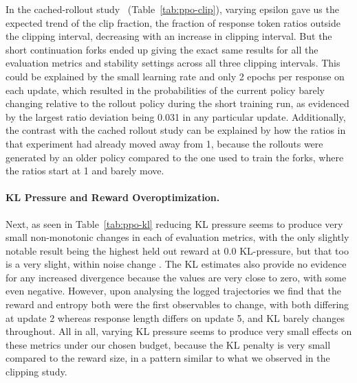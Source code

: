 \documentclass{article}
\begin{document}
 In the cached-rollout study ~(Table~\ref{tab:ppo-clip}), varying epsilon gave us the expected trend of the clip fraction, the fraction of response token ratios outside the clipping interval, decreasing with an increase in clipping interval. But the short continuation forks ended up giving the exact same results for all the evaluation metrics and stability settings across all three clipping intervals. This could be explained by the small learning rate and only 2 epochs per response on each update, which resulted in the probabilities of the current policy barely changing relative to the rollout policy during the short training run, as evidenced by the largest ratio deviation being 0.031 in any particular update. Additionally, the contrast with the cached rollout study can be explained by how the ratios in that experiment had already moved away from 1, because the rollouts were generated by an older policy compared to the one used to train the forks, where the ratios start at 1 and barely move.

\paragraph{KL Pressure and Reward Overoptimization.}\label{subsubsec:results-t2-kl}
 Next, as seen in Table~\ref{tab:ppo-kl} reducing KL pressure seems to produce very small non-monotonic changes in each of evaluation metrics, with the only slightly notable result being the highest held out reward at 0.0 KL-pressure, but that too is a very slight, within noise change . The KL estimates also provide no evidence for any increased divergence because the values are very close to zero, with some even negative. However, upon analysing the logged trajectories we find that the reward and entropy both were the first observables to change, with both differing at update 2 whereas response length differs on update 5, and KL barely changes throughout. All in all, varying KL pressure seems to produce very small effects on these metrics under our chosen budget, because the KL penalty is very small compared to the reward size, in a pattern similar to what we observed in the clipping study.
\end{document}
